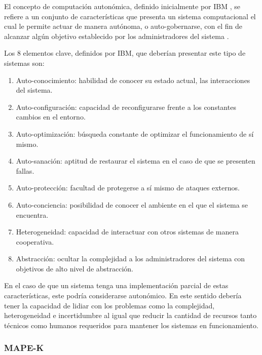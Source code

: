 \documentclass[12pt]{article}
\begin{document}

    El concepto de computación autonómica, definido inicialmente por IBM \citeyear{horn_2001}, se refiere a un conjunto de características que presenta un sistema computacional el cual le permite actuar de manera autónoma, o auto-gobernarse, con el fin de alcanzar algún objetivo establecido por los administradores del sistema \cite{lalanda_diaconescu_mccann_2014}.


    Los 8 elementos clave, definidos por IBM, que deberían presentar este tipo de sistemas son:
    \begin{enumerate}
        \item Auto-conocimiento: habilidad de conocer su estado actual, las interacciones del sistema.
        \item Auto-configuración: capacidad de reconfigurarse frente a los constantes cambios en el entorno.
        \item Auto-optimización: búsqueda constante de optimizar el funcionamiento de sí mismo.
        \item Auto-sanación: aptitud de restaurar el sistema en el caso de que se presenten fallas.
        \item Auto-protección: facultad de protegerse a sí mismo de ataques externos.
        \item Auto-conciencia: posibilidad de conocer el ambiente en el que el sistema se encuentra.
        \item Heterogeneidad: capacidad de interactuar con otros sistemas de manera cooperativa.
        \item Abstracción: ocultar la complejidad a los administradores del sistema con objetivos de alto nivel de abstracción.
    \end{enumerate}

    En el caso de que un sistema tenga una implementación parcial de estas características, este podría considerarse autonómico. En este sentido debería tener la capacidad de lidiar con los problemas como la complejidad, heterogeneidad e incertidumbre \cite{emerging_2005} al igual que reducir la cantidad de recursos tanto técnicos como humanos requeridos para mantener los sistemas en funcionamiento.
    
    \subsubsection*{MAPE-K}
\end{document}
